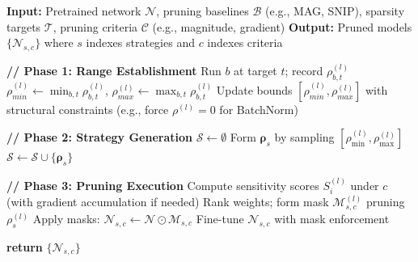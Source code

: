 \documentclass[11pt, conference]{IEEEtran}
\begin{document}




\begin{algorithm}[htbp]
\caption{Mix-and-Match Pruning Framework}
\label{alg:multistrategy}
\begin{algorithmic}[1]
\STATE \textbf{Input:} Pretrained network $\mathcal{N}$, pruning baselines $\mathcal{B}$ (e.g., MAG, SNIP), sparsity targets $\mathcal{T}$, pruning criteria $\mathcal{C}$ (e.g., magnitude, gradient)
\STATE \textbf{Output:} Pruned models $\{\mathcal{N}_{s,c}\}$ where $s$ indexes strategies and $c$ indexes criteria

\STATE \textbf{// Phase 1: Range Establishment}
        \STATE Run $b$ at target $t$; record $\rho_{b,t}^{(l)}$
    \ENDFOR
\ENDFOR
{}
    \STATE $\rho_{min}^{(l)} \gets \min_{b,t}\rho_{b,t}^{(l)}$, \;
           $\rho_{max}^{(l)} \gets \max_{b,t}\rho_{b,t}^{(l)}$
    \STATE Update bounds $[\rho_{min}^{(l)},\rho_{max}^{(l)}]$ with structural constraints (e.g., force $\rho^{(l)}=0$ for BatchNorm)
\ENDFOR

\STATE \textbf{// Phase 2: Strategy Generation}
\STATE $\mathcal{S} \gets \emptyset$
    \STATE Form $\boldsymbol{\rho}_s$ by sampling $[\rho_{\min}^{(l)},\rho_{\max}^{(l)}]$
    \STATE $\mathcal{S} \gets \mathcal{S} \cup \{\boldsymbol{\rho}_s\}$
\ENDFOR

\STATE \textbf{// Phase 3: Pruning Execution}
        \STATE Compute sensitivity scores $S_i^{(l)}$ under $c$ (with gradient accumulation if needed)
            \STATE Rank weights; form mask $\mathcal{M}_{s,c}^{(l)}$ pruning $\rho_s^{(l)}$
        \ENDFOR
        \STATE Apply masks: $\mathcal{N}_{s,c} \gets \mathcal{N} \odot \mathcal{M}_{s,c}$
        \STATE Fine-tune $\mathcal{N}_{s,c}$ with mask enforcement
    \ENDFOR
\ENDFOR

\STATE \textbf{return} $\{\mathcal{N}_{s,c}\}$
\end{algorithmic}
\end{algorithm}
\end{document}
